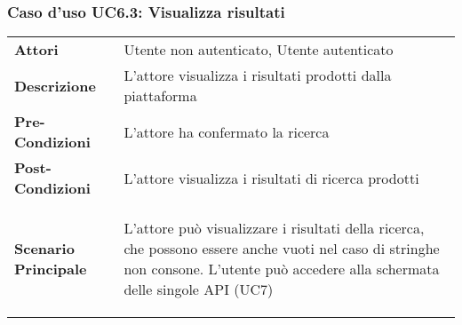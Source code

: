 \subsubsection{Caso d'uso UC6.3: Visualizza risultati}
\label{UC6_3}

\begin{minipage}{\linewidth}
	\begin{tabular}{ l | p{11cm}}
		\hline
		\rowcolor{Gray}
		\multicolumn{2}{c}{UC6.3 - Visualizza risultati} \\
		\hline
		\textbf{Attori} & Utente non autenticato, Utente autenticato \\
		\textbf{Descrizione} & L'attore visualizza i risultati prodotti dalla piattaforma\\
		\textbf{Pre-Condizioni} & L'attore ha confermato la ricerca\\
		\textbf{Post-Condizioni} & L'attore visualizza i risultati di ricerca prodotti \\
		\textbf{Scenario Principale} & 
		\begin{enumerate*}[label=(\arabic*.),itemjoin={\newline}]
			\item L'attore può visualizzare i risultati della ricerca, che possono essere anche vuoti nel caso di stringhe non consone. L'utente può accedere alla schermata delle singole API (UC7)
		\end{enumerate*}\\
	\end{tabular}
\end{minipage}